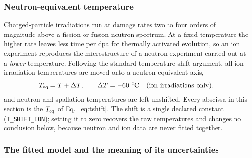 \subsubsection*{Neutron-equivalent temperature}

Charged-particle irradiations run at damage rates two to four orders of magnitude
above a fission or fusion neutron spectrum. At a fixed temperature the higher
rate leaves less time per dpa for thermally activated evolution, so an ion
experiment reproduces the microstructure of a neutron experiment carried out at a
\emph{lower} temperature. Following the standard temperature-shift argument, all
ion-irradiation temperatures are moved onto a neutron-equivalent axis,
\begin{equation}
  T_{\rm eq} = T + \Delta T, \qquad \Delta T = -60~^{\circ}\mathrm{C}
  \quad\text{(ion irradiations only)},
  \label{eq:tshift}
\end{equation}
and neutron and spallation temperatures are left unshifted. Every abscissa in
this section is the $T_{\rm eq}$ of Eq.~\eqref{eq:tshift}. The shift is a single declared constant
(\texttt{T\_SHIFT\_ION}); setting it to zero recovers the raw temperatures and
changes no conclusion below, because neutron and ion data are never fitted
together.

\subsubsection*{The fitted model and the meaning of its uncertainties}

